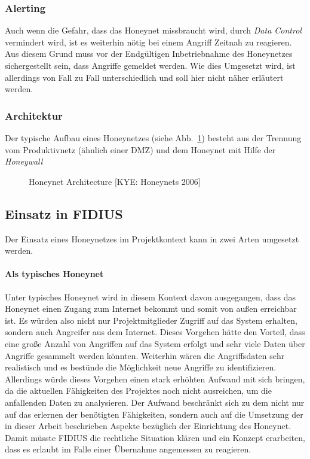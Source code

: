 \subsubsection{Alerting} Auch wenn die Gefahr, dass das Honeynet
missbraucht wird, durch \textit{Data Control} vermindert wird, ist es
weiterhin nötig bei einem Angriff Zeitnah zu reagieren. Aus diesem
Grund muss vor der Endgültigen Inbetriebnahme des Honeynetzes
sichergestellt sein, dass Angriffe gemeldet werden. Wie dies Umgesetzt
wird, ist allerdings von Fall zu Fall unterschiedlich und soll hier
nicht näher erläutert werden.  \clearpage

\subsubsection{Architektur} Der typische Aufbau eines Honeynetzes
(siehe Abb.~\ref{fig:honeynet}) besteht aus der Trennung vom
Produktivnetz (ähnlich einer DMZ) und dem Honeynet mit Hilfe der
\textit{Honeywall}
\begin{figure}[htbp] 
    \center 
    \caption{Honeynet Architecture [KYE: Honeynets 2006]}
    \label{fig:honeynet}
\end{figure}

\subsection{Einsatz in FIDIUS} Der Einsatz eines Honeynetzes im
Projektkontext kann in zwei Arten umgesetzt werden.
\paragraph*{Als typisches Honeynet} Unter typisches Honeynet wird in
diesem Kontext davon ausgegangen, dass das Honeynet einen Zugang zum
Internet bekommt und somit von außen erreichbar ist.  Es würden also
nicht nur Projektmitglieder Zugriff auf das System erhalten, sondern
auch Angreifer aus dem Internet. Dieses Vorgehen hätte den Vorteil,
dass eine große Anzahl von Angriffen auf das System erfolgt und sehr
viele Daten über Angriffe gesammelt werden könnten. Weiterhin wären
die Angriffsdaten sehr realistisch und es bestünde die Möglichkeit
neue Angriffe zu identifizieren. Allerdings würde dieses Vorgehen
einen stark erhöhten Aufwand mit sich bringen, da die aktuellen
Fähigkeiten des Projektes noch nicht ausreichen, um die anfallenden
Daten zu analysieren. Der Aufwand beschränkt sich zu dem nicht nur auf
das erlernen der benötigten Fähigkeiten, sondern auch auf die
Umsetzung der in dieser Arbeit beschrieben Aspekte bezüglich der
Einrichtung des Honeynet. Damit müsste FIDIUS die rechtliche Situation
klären und ein Konzept erarbeiten, dass es erlaubt im Falle einer
Übernahme angemessen zu reagieren.

